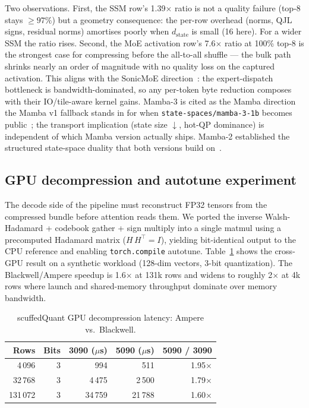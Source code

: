 \documentclass[11pt,letterpaper]{article}
\theoremstyle{definition}
\begin{document}
Two observations. First, the SSM row's 1.39$\times$ ratio is not a
quality failure (top-8 stays $\geq 97\%$) but a geometry consequence:
the per-row overhead (norms, QJL signs, residual norms) amortises
poorly when $d_{\text{state}}$ is small (16 here). For a wider SSM
the ratio rises. Second, the MoE activation row's 7.6$\times$ ratio
at 100\% top-8 is the strongest case for compressing before the
all-to-all shuffle --- the bulk path shrinks nearly an order of
magnitude with no quality loss on the captured activation. This
aligns with the SonicMoE direction~\cite{guo2026sonicmoe}: the
expert-dispatch bottleneck is bandwidth-dominated, so any per-token
byte reduction composes with their IO/tile-aware kernel gains.
Mamba-3 is cited as the Mamba direction the Mamba v1 fallback
stands in for when \texttt{state-spaces/mamba-3-1b} becomes
public~\cite{lahoti2026mamba3}; the transport implication
(state size $\downarrow$, hot-QP dominance) is independent of
which Mamba version actually ships. Mamba-2 established the
structured state-space duality that both versions build on~\cite{dao2024mamba2}.

\subsection{GPU decompression and autotune experiment}
\label{sec:gpu-decompress}

The decode side of the pipeline must reconstruct FP32 tensors from
the compressed bundle before attention reads them. We ported the
inverse Walsh-Hadamard + codebook gather + sign multiply into a
single matmul using a precomputed Hadamard matrix
($H\,H^\top = I$), yielding bit-identical output to the CPU
reference and enabling \texttt{torch.compile} autotune.
Table~\ref{tab:gpu-decompress-ratio} shows the cross-GPU result
on a synthetic workload (128-dim vectors, 3-bit quantization). The
Blackwell/Ampere speedup is 1.6$\times$ at 131k rows and widens to
roughly 2$\times$ at 4k rows where launch and shared-memory
throughput dominate over memory bandwidth.

\begin{table}[htbp]
\centering
\caption{scuffedQuant GPU decompression latency: Ampere vs.\
Blackwell.}
\label{tab:gpu-decompress-ratio}
\small
\begin{tabular}{rrrrr}
\toprule
Rows    & Bits & 3090 ($\mu$s) & 5090 ($\mu$s) & 5090 / 3090 \\
\midrule
4\,096   & 3 & 994   & 511   & 1.95$\times$ \\
32\,768  & 3 & 4\,475  & 2\,500  & 1.79$\times$ \\
131\,072 & 3 & 34\,759 & 21\,788 & 1.60$\times$ \\
\bottomrule
\end{tabular}
\end{table}
\end{document}
